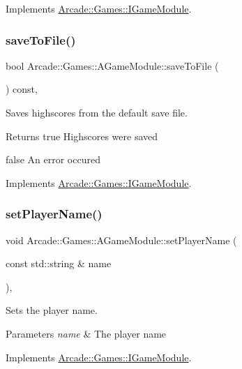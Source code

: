 Implements \mbox{\hyperlink{classArcade_1_1Games_1_1IGameModule_a3cf053ce2f4ccfe13e9c10d8549f7c82}{Arcade\+::\+Games\+::\+I\+Game\+Module}}.

\mbox{\label{classArcade_1_1Games_1_1AGameModule_a82fdd06480edd7f727504f5073730812}} 
\subsubsection{\texorpdfstring{saveToFile()}{saveToFile()}\hspace{0.1cm}{\footnotesize\ttfamily [2/2]}}
{\footnotesize\ttfamily bool Arcade\+::\+Games\+::\+A\+Game\+Module\+::save\+To\+File (\begin{DoxyParamCaption}{ }\end{DoxyParamCaption}) const\hspace{0.3cm}{\ttfamily [final]}, {\ttfamily [virtual]}}



Saves highscores from the default save file. 

\begin{DoxyReturn}{Returns}
true Highscores were saved 

false An error occured 
\end{DoxyReturn}


Implements \mbox{\hyperlink{classArcade_1_1Games_1_1IGameModule_ada0aa1d3d52bcdedcdb35b95d956c8ee}{Arcade\+::\+Games\+::\+I\+Game\+Module}}.

\mbox{\label{classArcade_1_1Games_1_1AGameModule_abdbf4cf008033b5f339d9758d7f2b8a2}} 
\subsubsection{\texorpdfstring{setPlayerName()}{setPlayerName()}}
{\footnotesize\ttfamily void Arcade\+::\+Games\+::\+A\+Game\+Module\+::set\+Player\+Name (\begin{DoxyParamCaption}\item[{const std\+::string \&}]{name }\end{DoxyParamCaption})\hspace{0.3cm}{\ttfamily [final]}, {\ttfamily [virtual]}}



Sets the player name. 


\begin{DoxyParams}{Parameters}
{\em name} & The player name \\
\hline
\end{DoxyParams}


Implements \mbox{\hyperlink{classArcade_1_1Games_1_1IGameModule_aad433296fe8a4582ebfdad5827a13d59}{Arcade\+::\+Games\+::\+I\+Game\+Module}}.

